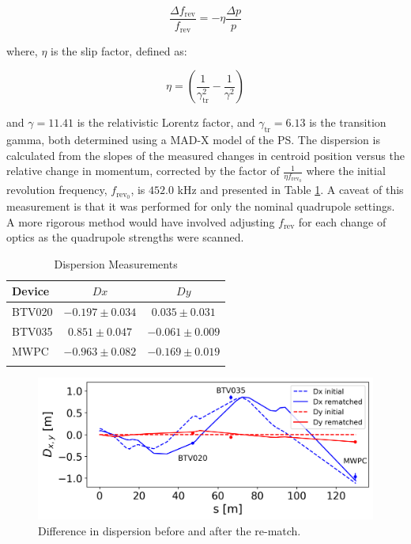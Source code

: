 \documentclass[a4paper,
               biblatex,     %
               ]{jacow}
\begin{document}
\begin{equation}
\frac{\Delta f_{\text{rev}}}{f_{\text{rev}}} = -\eta \frac{\Delta p}{p}
\end{equation}

\noindent where, $\eta$ is the slip factor, defined as:

\begin{equation}
\eta = \left(\frac{1}{\gamma_{\text{tr}}^{2}} - \frac{1}{\gamma^{2}}\right)
\end{equation}

\noindent and $\gamma = 11.41$ is the relativistic Lorentz factor, and $\gamma_{\text{tr}} = 6.13$ is the transition gamma, both determined using a MAD-X \cite{noauthor_mad_nodate} model of the PS. The dispersion is calculated from the slopes of the measured changes in centroid position versus the relative change in momentum, corrected by the factor of $\frac{1}{\eta f_{\text{rev}_0}}$ where the initial revolution frequency, $f_{\text{rev}_0}$, is $452.0$ kHz and presented in Table \ref{tab:dispersion}. A caveat of this measurement is that it was performed for only the nominal quadrupole settings. A more rigorous method would have involved adjusting $f_{\text{rev}}$ for each change of optics as the quadrupole strengths were scanned.

\begin{table}[h!]
\centering
\caption{Dispersion Measurements}
\begin{tabular}{l c c}
\hline
Device & \(Dx\) & \(Dy\) \\
\hline
BTV020  & \(-0.197 \pm 0.034\) & \(0.035 \pm 0.031\) \\
BTV035  & \(0.851 \pm 0.047\) & \(-0.061 \pm 0.009\) \\
MWPC   & \(-0.963 \pm 0.082\) & \(-0.169 \pm 0.019\) \\
\hline
\label{tab:dispersion}
\end{tabular}
\end{table}

\begin{figure}[!htb]
   \centering
   \includegraphics*[width=1.0\columnwidth]{THPR30_f1.png}
   \caption{Difference in dispersion before and after the re-match.}
   \label{fig:dispersion}
\end{figure}
\end{document}

